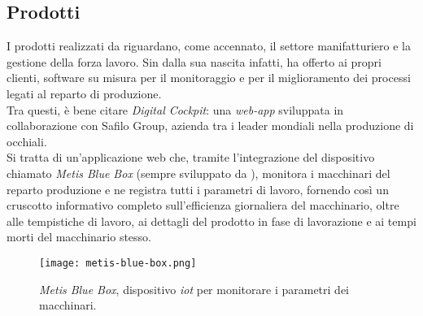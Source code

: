 \subsection{Prodotti}
I prodotti realizzati da \AD{} riguardano, come accennato, il settore manifatturiero e la gestione della forza lavoro.
Sin dalla sua nascita infatti, \AD{} ha offerto ai propri clienti, software su misura per il monitoraggio e per il miglioramento dei processi legati al reparto di produzione.\\
Tra questi, è bene citare \textit{Digital Cockpit}: una \textit{web-app} sviluppata in collaborazione con Safilo Group, azienda tra i leader mondiali nella produzione di occhiali.\\
Si tratta di un'applicazione web che, tramite l'integrazione del dispositivo  chiamato \textit{Metis Blue Box} (sempre sviluppato da \AD ), monitora i macchinari del reparto produzione e ne registra tutti i parametri di lavoro, fornendo così un cruscotto informativo completo sull'efficienza giornaliera del macchinario, oltre alle tempistiche di lavoro, ai dettagli del prodotto in fase di lavorazione e ai tempi morti del macchinario stesso.\\
\begin{figure}[h]
\texttt{[image: metis-blue-box.png]}
\centering
\caption{\textit{Metis Blue Box}, dispositivo \textit{\acrshort{iot}} per monitorare i parametri dei macchinari.}
\label{fig:metis-blue-box}
\end{figure}

